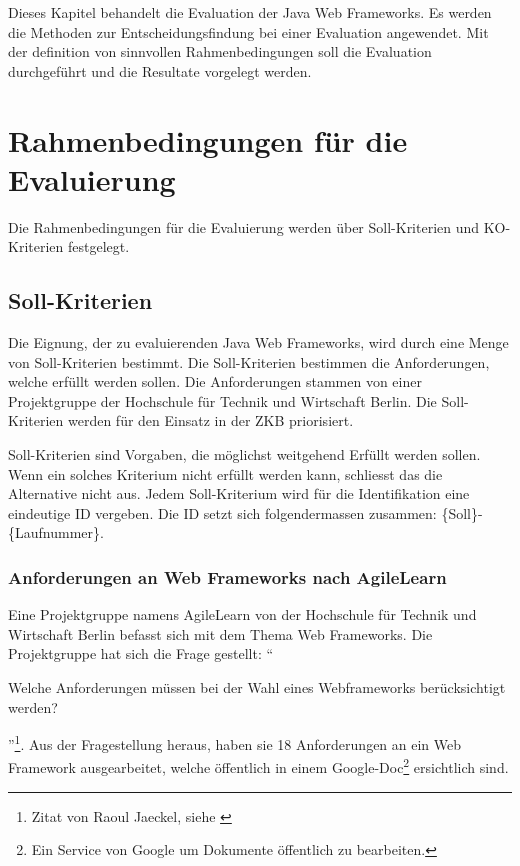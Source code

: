   Dieses Kapitel behandelt die Evaluation der Java Web Frameworks. Es werden die
  Methoden zur Entscheidungsfindung bei einer Evaluation angewendet. Mit der
  definition von sinnvollen Rahmenbedingungen soll die Evaluation durchgeführt
  und die Resultate vorgelegt werden.
    
  \section{Rahmenbedingungen für die Evaluierung}
  
  Die Rahmenbedingungen für die Evaluierung werden über Soll-Kriterien und
  KO-Kriterien festgelegt.

  \subsection{Soll-Kriterien}
  
  Die Eignung, der zu evaluierenden Java Web Frameworks, wird durch eine Menge
  von Soll-Kriterien bestimmt. Die Soll-Kriterien bestimmen die Anforderungen,
  welche erfüllt werden sollen. Die Anforderungen stammen von einer
  Projektgruppe der Hochschule für Technik und Wirtschaft Berlin. Die
  Soll-Kriterien werden für den Einsatz in der \ac{ZKB} priorisiert.
  
  Soll-Kriterien sind Vorgaben, die möglichst weitgehend Erfüllt werden sollen.
  Wenn ein solches Kriterium nicht erfüllt werden kann, schliesst das die
  Alternative nicht aus. Jedem Soll-Kriterium wird für die Identifikation eine
  eindeutige ID vergeben. Die ID setzt sich folgendermassen zusammen: 
  \{Soll\}-\{Laufnummer\}.
  
  \subsubsection{Anforderungen an Web Frameworks nach AgileLearn}
  
  Eine Projektgruppe namens AgileLearn von der Hochschule für Technik und
  Wirtschaft Berlin befasst sich mit dem Thema Web Frameworks. Die
  Projektgruppe hat sich die Frage gestellt: ``\begin{itshape}Welche
  Anforderungen müssen bei der Wahl eines Webframeworks berücksichtigt
  werden?\end{itshape}''\footnote{Zitat von Raoul Jaeckel, siehe
  \cite{AnforderungenAnWebframeworks}}. Aus der Fragestellung heraus, haben sie
  18 Anforderungen an ein Web Framework ausgearbeitet, welche öffentlich in
  einem Google-Doc\footnote{Ein Service von Google um Dokumente öffentlich zu
  bearbeiten.} ersichtlich sind.
  
